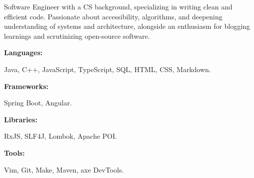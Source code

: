 \documentclass[9pt]{util} %
\begin{document}
\begin{minipage}[t]{0.475\textwidth}
	\vspace{-6pt}
	 
	Software Engineer with a CS background, specializing in writing clean and efficient code. Passionate about accessibility, algorithms, and deepening understanding of systems and architecture, alongside an enthusiasm for blogging learnings and scrutinizing open-source software.
	
\end{minipage}
\hfill %
\begin{minipage}[t]{0.475\textwidth}
	\vspace{-6pt}
	    
	\begin{minipage}[t]{0.2\textwidth}
		\textbf{Languages:}
	\end{minipage}
	\hfill
	\begin{minipage}[t]{0.73\textwidth}
		Java, C++, JavaScript, TypeScript, SQL, HTML, CSS, Markdown.  
	\end{minipage}
	\vspace{1mm}
	    
	\begin{minipage}[t]{0.2\textwidth}
		\textbf{Frameworks:}
	\end{minipage}
	\hfill
	\begin{minipage}[t]{0.73\textwidth}
		Spring Boot, Angular.
	\end{minipage}
	\vspace{1mm}
	    
	\begin{minipage}[t]{0.2\textwidth}
		\textbf{Libraries:}
	\end{minipage}
	\hfill
	\begin{minipage}[t]{0.73\textwidth}
		RxJS, SLF4J, Lombok, Apache POI.
	\end{minipage}
	\vspace{1mm}
	       
	\begin{minipage}[t]{0.2\textwidth}
		\textbf{Tools:}
	\end{minipage}
	\hfill
	\begin{minipage}[t]{0.73\textwidth}
		Vim, Git, Make, Maven, axe DevTools.
	\end{minipage}
	\vspace{1mm}
	    
\end{minipage}
\end{document}

